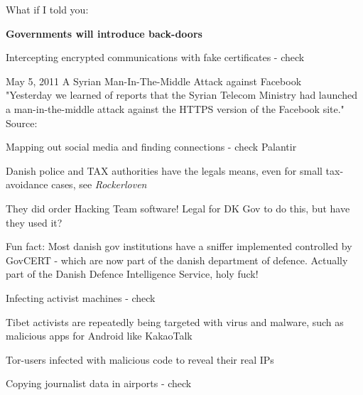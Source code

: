 \documentclass[20pt,landscape,a4paper,footrule]{foils}
\begin{document}

What if I told you:

{\Large \bf Governments will introduce back-doors}


\begin{list1}
\item Intercepting encrypted communications with fake certificates - check
\item May 5, 2011 A Syrian Man-In-The-Middle Attack against Facebook\\
"Yesterday we learned of reports that the Syrian Telecom Ministry had launched a man-in-the-middle attack against the HTTPS version of the Facebook site."\\
{\small Source:\\
}
\end{list1}



\begin{list1}
\item Mapping out social media and finding connections - check Palantir
\item Danish police and TAX authorities have the legals means, even for small tax-avoidance cases, see \emph{Rockerloven}
\item
They did order Hacking Team software!
Legal for DK Gov to do this, but have they used it?

\item Fun fact: Most danish gov institutions have a sniffer implemented controlled by GovCERT - which are now part of the danish department of defence. Actually part of the Danish Defence Intelligence Service, holy fuck!


\end{list1}


\begin{list1}
\item Infecting activist machines - check
\item Tibet activists are repeatedly being targeted with virus and malware, such as malicious apps for Android like KakaoTalk
\item Tor-users infected with malicious code to reveal their real IPs

\item {\footnotesize{}}
\item Copying journalist data in airports - check

\end{list1}
\end{document}
